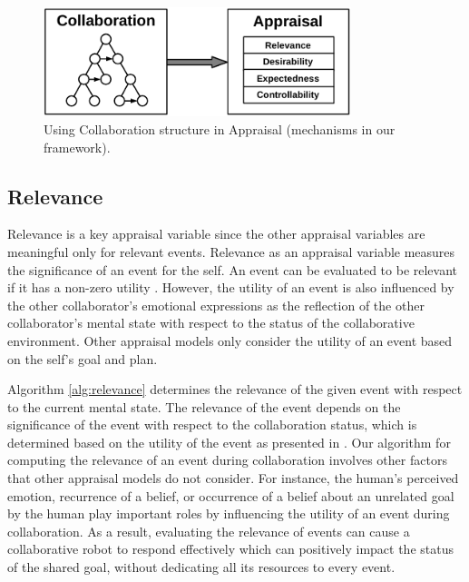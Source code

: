 \documentclass[12pt]{report}
\begin{document}
\begin{figure}[tbh]
  \centering
  \includegraphics[width=0.8\textwidth]{figure/appraisal-collaboration-croped.pdf}
  \caption{Using Collaboration structure in Appraisal (mechanisms in our
  framework).}
  \label{fig:appraisal-collaboration}
\end{figure}

\subsection{Relevance}
\label{sec:relevance}
Relevance is a key appraisal variable since the other appraisal variables
are meaningful only for relevant events. Relevance as an appraisal variable
measures the significance of an event for the self. An event can be evaluated to
be relevant if it has a non-zero utility \cite{marsella:ema-process-model}.
However, the utility of an event is also influenced by the other collaborator's
emotional expressions as the reflection of the other collaborator's mental state
with respect to the status of the collaborative environment. Other appraisal
models only consider the utility of an event based on the self's goal and plan.

Algorithm \ref{alg:relevance} determines the relevance of the given event with
respect to the current mental state. The relevance of the event depends on the
significance of the event with respect to the collaboration status, which is
determined based on the utility of the event as presented in
\cite{gratch:domain-independent,marsella:ema-process-model}. Our algorithm for
computing the relevance of an event during collaboration involves other factors
that other appraisal models do not consider. For instance, the human's
perceived emotion, recurrence of a belief, or occurrence of a belief about an
unrelated goal by the human play important roles by influencing the utility
of an event during collaboration. As a result, evaluating the relevance of
events can cause a collaborative robot to respond effectively which can
positively impact the status of the shared goal, without dedicating all its
resources to every event.
\end{document}

